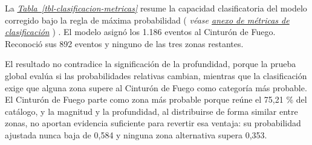 \documentclass[
  spanish,
  letterpaper,
  DIV=11,
  numbers=noendperiod]{scrartcl}
\newcommand{\asesoriaStyledRef}[1]{%
  {\hypersetup{linkcolor=asesoriaLinkColor,urlcolor=asesoriaLinkColor,citecolor=asesoriaLinkColor}\textcolor{asesoriaLinkColor}{\emph{#1}}}%
}
\newcommand{\asesoriaParenRef}[1]{%
  \textnormal{\textcolor{asesoriaTextColor}{(}}%
  {\hypersetup{linkcolor=asesoriaLinkColor,urlcolor=asesoriaLinkColor,citecolor=asesoriaLinkColor}\textcolor{asesoriaTextColor}{\emph{#1}}}%
  \textnormal{\textcolor{asesoriaTextColor}{)}}%
}
\newcommand{\asesoriaTableLink}[1]{\hyperref[#1]{Tabla~\ref*{#1}}}
\newcommand{\asesoriaTableRef}[1]{\asesoriaStyledRef{\asesoriaTableLink{#1}}}
\begin{document}
\newsavebox{\tblClasificacionMetricasBox}
\noindent
\begin{minipage}[t]{\dimexpr\linewidth-\wd\tblClasificacionMetricasBox-1em\relax}
\vspace{0pt}
La \asesoriaTableRef{tbl-clasificacion-metricas} resume la capacidad clasificatoria del modelo corregido bajo la regla de máxima probabilidad \asesoriaParenRef{véase \hyperref[sec-anexo-metricas-clasificacion]{anexo de métricas de clasificación}}. El modelo asignó los 1.186 eventos al Cinturón de Fuego. Reconoció sus 892 eventos y ninguno de las tres zonas restantes.
\end{minipage}\hfill
\begin{minipage}[t]{\wd\tblClasificacionMetricasBox}
\vspace{0pt}
\begingroup
\scriptsize
\centering
{}
{}
\label{tbl-clasificacion-metricas}
\hypertarget{dest-tbl-clasificacion-metricas}{}
\usebox{\tblClasificacionMetricasBox}
\par\vspace{0.10em}
\endgroup
\end{minipage}
\par\vspace{-0.25em}

El resultado no contradice la significación de la profundidad, porque la
prueba global evalúa si las probabilidades relativas cambian, mientras
que la clasificación exige que alguna zona supere al Cinturón de Fuego
como categoría más probable. El Cinturón de Fuego parte como zona más
probable porque reúne el 75,21 \% del catálogo, y la magnitud y la
profundidad, al distribuirse de forma similar entre zonas, no aportan
evidencia suficiente para revertir esa ventaja: su probabilidad ajustada
nunca baja de 0,584 y ninguna zona alternativa supera 0,353.
\end{document}
